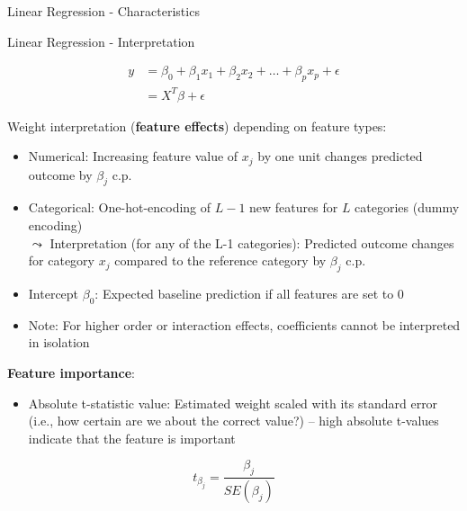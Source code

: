 \documentclass[11pt,compress,t,notes=noshow, aspectratio=169, xcolor=table]{beamer}
\begin{document}
\begin{frame}[c]{Linear Regression - Characteristics}
\begin{itemize}
    \end{itemize}

\end{frame}


\begin{frame}[c]{Linear Regression - Interpretation}

\begin{align*}
y &= \beta_0 + \beta_1 x_1 + \beta_2 x_2 + \dots + \beta_p x_p + \epsilon \\
 &= X^T\beta + \epsilon
\end{align*}

    Weight interpretation (\textbf{feature effects}) depending on feature types:
    \begin{itemize}
        \item Numerical: Increasing feature value of $x_j$ by one unit changes predicted outcome by $\beta_j$ c.p.
        \item Categorical: One-hot-encoding of $L-1$ new features for $L$ categories (dummy encoding) \\
        $\leadsto$ Interpretation (for any of the L-1 categories): Predicted outcome changes for category $x_j$ compared to the reference category by $\beta_j$ c.p.\pause
        \item Intercept $\beta_0$: Expected baseline prediction if all features are set to 0 %
        \item Note: For higher order or interaction effects, coefficients cannot be interpreted in isolation
    \end{itemize}	
    \pause
    \textbf{Feature importance}:
    \begin{itemize}
        \item Absolute t-statistic value: Estimated weight scaled with its standard error (i.e., how certain are we about the correct value?) -- high absolute t-values indicate that the feature is important
    \end{itemize}
    $$t_{\beta_j} = \frac{\beta_j}{SE(\beta_j)} $$
\end{frame}
\end{document}
